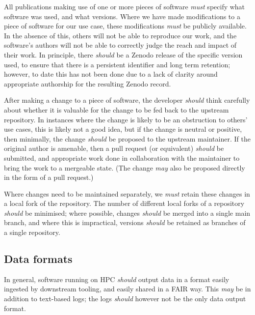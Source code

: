 \documentclass{article}
\newcommand\rfcword[1]{\emph{#1}\xspace}
\newcommand\must{\rfcword{must}}
\newcommand\should{\rfcword{should}}
\newcommand\may{\rfcword{may}}
\begin{document}
All publications making use of one or more pieces of software
\must specify what software was used,
and what versions.
Where we have made modifications to a piece of software for our use case,
these modifications \must be publicly available.
In the absence of this,
others will not be able to reproduce our work,
and the software's authors will not be able to correctly judge
the reach and impact of their work.
In principle,
there \should be a Zenodo release of the specific version used,
to ensure that there is a persistent identifier and long term retention;
however,
to date this has not been done due to
a lack of clarity around appropriate authorship for the resulting Zenodo record.

After making a change to a piece of software,
the developer \should think carefully about whether
it is valuable for the change to  be fed back to the upstream repository.
In instances where the change is likely to be an obstruction to others' use cases,
this is likely not a good idea,
but if the change is neutral or positive,
then minimally,
the change \should be proposed to the upstream maintainer.
If the original author is amenable,
then a pull request
(or equivalent)
\should be submitted,
and appropriate work done in collaboration with the maintainer
to bring the work to a mergeable state.
(The change \may also be proposed directly in the form of a pull request.)

Where changes need to be maintained separately,
we \must retain these changes in a local fork of the repository.
The number of different local forks of a repository \should be minimised;
where possible,
changes \should be merged into a single main branch,
and where this is impractical,
versions \should be retained as branches of a single repository.

\subsection{Data formats}

In general,
software running on HPC \should output data in a format easily ingested by downstream tooling,
and easily shared in a FAIR way.
This \may be in addition to text-based logs;
the logs \should however not be the only data output format.
\end{document}
